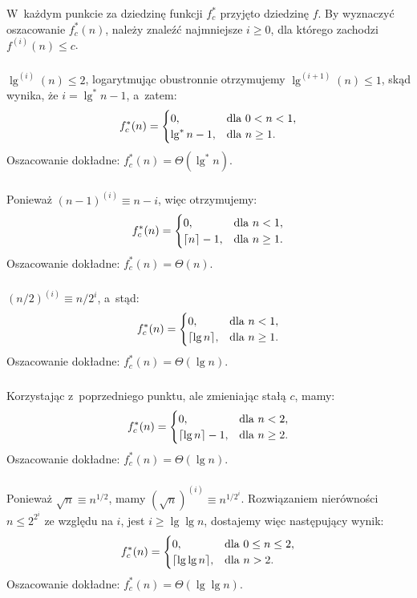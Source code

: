 W~każdym punkcie za dziedzinę funkcji $f_c^*$ przyjęto dziedzinę $f$. By wyznaczyć oszacowanie $f_c^*(n)$, należy znaleźć najmniejsze $i\ge0$, dla którego zachodzi $f^{(i)}(n)\le c$.

\subsubsection{} %
$\lg^{(i)}(n)\le2$, logarytmując obustronnie otrzymujemy $\lg^{(i+1)}(n)\le 1$, skąd wynika, że $i=\lg^*n-1$, a~zatem:
\[
	f_c^*(n) =
	\begin{cases}
		0, & \hbox{dla }0<n<1, \\
		\lg^*n-1, & \hbox{dla }n\ge1.
	\end{cases}
\]
Oszacowanie dokładne: $f_c^*(n)=\Theta(\lg^*n)$.

\subsubsection{} %
Ponieważ $(n-1)^{(i)}\equiv n-i$, więc otrzymujemy:
\[
	f_c^*(n) =
	\begin{cases}
		0, & \hbox{dla }n<1, \\
		\lceil n\rceil-1, & \hbox{dla }n\ge1.
	\end{cases}
\]
Oszacowanie dokładne: $f_c^*(n)=\Theta(n)$.

\subsubsection{} %
$(n/2)^{(i)}\equiv n/2^i$, a~stąd:
\[
	f_c^*(n) =
	\begin{cases}
		0, & \hbox{dla }n<1, \\
		\lceil\lg n\rceil, & \hbox{dla }n\ge1.
	\end{cases}
\]
Oszacowanie dokładne: $f_c^*(n)=\Theta(\lg n)$.

\subsubsection{} %
Korzystając z~poprzedniego punktu, ale zmieniając stałą $c$, mamy:
\[
	f_c^*(n) =
	\begin{cases}
		0, & \hbox{dla }n<2, \\
		\lceil\lg n\rceil-1, & \hbox{dla }n\ge2.
	\end{cases}
\]
Oszacowanie dokładne: $f_c^*(n)=\Theta(\lg n)$.

\subsubsection{} %
Ponieważ $\sqrt{n}\equiv n^{1/2}$, mamy $(\sqrt{n})^{(i)}\equiv n^{1/2^i}$. Rozwiązaniem nierówności $n\le2^{2^i}$ ze względu na $i$, jest $i\ge\lg\lg n$, dostajemy więc następujący wynik:
\[
	f_c^*(n) =
	\begin{cases}
		0, & \hbox{dla }0\le n\le2, \\
		\lceil\lg\lg n\rceil, & \hbox{dla }n>2.
	\end{cases}
\]
Oszacowanie dokładne: $f_c^*(n)=\Theta(\lg\lg n)$.

